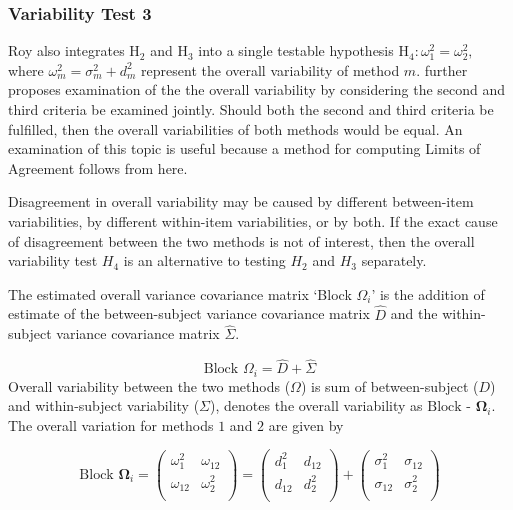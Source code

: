 \documentclass[12pt, a4paper]{report}
\theoremstyle{plain}
\theoremstyle{definition}
\theoremstyle{remark}
\begin{document}
	\subsubsection{Variability Test 3}
	Roy also integrates $\mathrm{H}_2$ and $\mathrm{H}_3$ into a single testable hypothesis $\mathrm{H}_4\colon \omega^2_1=\omega^2_2,$ where $\omega^2_m = \sigma^2_m + d^2_m$ represent the overall variability of method $m.$ \citet{ARoy2009} further proposes examination of the the overall variability by considering the second and third criteria be examined jointly. Should both the second and third criteria be fulfilled, then the overall variabilities of both methods would be equal. An examination of this topic is useful because a method for computing Limits of Agreement follows from here.
		

	
	
	Disagreement in overall variability may be caused by different between-item variabilities, by different within-item variabilities, or by both.  If the exact cause of disagreement between the two methods is not of interest, then the overall variability test $H_4$ is an alternative to testing $H_2$ and $H_3$ separately.
	
		The estimated overall variance covariance matrix `Block
		$\Omega_{i}$' is the addition of estimate of the between-subject variance covariance matrix $\hat{D}$ and the within-subject variance covariance matrix $\hat{\Sigma}$.
		
		\begin{equation}
		\mbox{Block  }\Omega_{i} = \hat{D} + \hat{\Sigma}
		\end{equation}
		Overall variability between the two methods ($\Omega$) is sum of between-subject ($D$) and within-subject variability ($\Sigma$),
		\citet{ARoy2009} denotes the overall variability	as ${\mbox{Block - }\boldsymbol \Omega_{i}}$. The overall variation for methods $1$ and $2$ are given by
		
		\begin{center}
			\[\mbox{Block } \boldsymbol{\Omega}_i = \left(\begin{array}{cc}
			\omega^2_1  & \omega_{12} \\
			\omega_{12} & \omega^2_2 \\
			\end{array}  \right)
			=  \left(
			\begin{array}{cc}
			d^2_1  & d_{12} \\
			d_{12} & d^2_2 \\
			\end{array} \right)+
			\left(
			\begin{array}{cc}
			\sigma^2_1  & \sigma_{12} \\
			\sigma_{12} & \sigma^2_2 \\
			\end{array}\right)
			\]
		\end{center}
		
\end{document}
